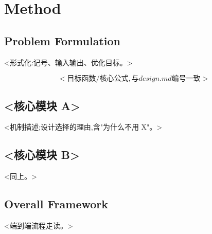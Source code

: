 \section{Method}\label{sec:method}

\subsection{Problem Formulation}
<形式化:记号、输入输出、优化目标。>

\begin{equation}
  <目标函数/核心公式,与 design.md 编号一致>
  \label{eq:objective}
\end{equation}

\subsection{<核心模块 A>}
<机制描述;设计选择的理由,含"为什么不用 X"。>

\subsection{<核心模块 B>}
<同上。>

\subsection{Overall Framework}
<端到端流程走读。>

